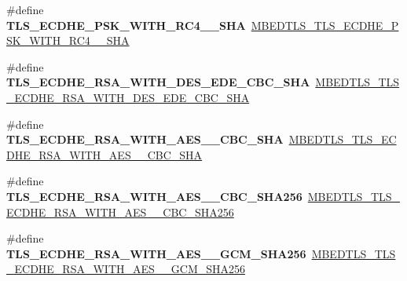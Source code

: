 \begin{DoxyCompactItemize}
\mbox{\label{compat-1_83_8h_a7d019962fe8f70ddc729687a7e0ccdb9}} 
\#define {\bfseries T\+L\+S\+\_\+\+E\+C\+D\+H\+E\+\_\+\+P\+S\+K\+\_\+\+W\+I\+T\+H\+\_\+\+R\+C4\+\_\+\_\+\+S\+HA}~\mbox{\hyperlink{ssl__ciphersuites_8h_a1dcf92a298581fa05208a0dbd34bb2fb}{M\+B\+E\+D\+T\+L\+S\+\_\+\+T\+L\+S\+\_\+\+E\+C\+D\+H\+E\+\_\+\+P\+S\+K\+\_\+\+W\+I\+T\+H\+\_\+\+R\+C4\+\_\+\_\+\+S\+HA}}
\item 
\mbox{\label{compat-1_83_8h_a7f0f5245bc820bbc208a4b30e3ea3302}} 
\#define {\bfseries T\+L\+S\+\_\+\+E\+C\+D\+H\+E\+\_\+\+R\+S\+A\+\_\+\+W\+I\+T\+H\+\_\+D\+E\+S\+\_\+\+E\+D\+E\+\_\+\+C\+B\+C\+\_\+\+S\+HA}~\mbox{\hyperlink{ssl__ciphersuites_8h_a2ce6bb7b4689abcfc4d1e60e4da6e8af}{M\+B\+E\+D\+T\+L\+S\+\_\+\+T\+L\+S\+\_\+\+E\+C\+D\+H\+E\+\_\+\+R\+S\+A\+\_\+\+W\+I\+T\+H\+\_\+D\+E\+S\+\_\+\+E\+D\+E\+\_\+\+C\+B\+C\+\_\+\+S\+HA}}
\item 
\mbox{\label{compat-1_83_8h_a61caecb35301de4dba9ea87288f58b91}} 
\#define {\bfseries T\+L\+S\+\_\+\+E\+C\+D\+H\+E\+\_\+\+R\+S\+A\+\_\+\+W\+I\+T\+H\+\_\+\+A\+E\+S\+\_\+\_\+\+C\+B\+C\+\_\+\+S\+HA}~\mbox{\hyperlink{ssl__ciphersuites_8h_a21b4bdb8de8f579c591bc5c45f1faf05}{M\+B\+E\+D\+T\+L\+S\+\_\+\+T\+L\+S\+\_\+\+E\+C\+D\+H\+E\+\_\+\+R\+S\+A\+\_\+\+W\+I\+T\+H\+\_\+\+A\+E\+S\+\_\+\_\+\+C\+B\+C\+\_\+\+S\+HA}}
\item 
\mbox{\label{compat-1_83_8h_acdd0b724733e8b6e408cc7ce53b6d0db}} 
\#define {\bfseries T\+L\+S\+\_\+\+E\+C\+D\+H\+E\+\_\+\+R\+S\+A\+\_\+\+W\+I\+T\+H\+\_\+\+A\+E\+S\+\_\+\_\+\+C\+B\+C\+\_\+\+S\+H\+A256}~\mbox{\hyperlink{ssl__ciphersuites_8h_a70908a91d8e474b415acfaf437e451a1}{M\+B\+E\+D\+T\+L\+S\+\_\+\+T\+L\+S\+\_\+\+E\+C\+D\+H\+E\+\_\+\+R\+S\+A\+\_\+\+W\+I\+T\+H\+\_\+\+A\+E\+S\+\_\+\_\+\+C\+B\+C\+\_\+\+S\+H\+A256}}
\item 
\mbox{\label{compat-1_83_8h_a3654359382307a986b1834a812c69f64}} 
\#define {\bfseries T\+L\+S\+\_\+\+E\+C\+D\+H\+E\+\_\+\+R\+S\+A\+\_\+\+W\+I\+T\+H\+\_\+\+A\+E\+S\+\_\+\_\+\+G\+C\+M\+\_\+\+S\+H\+A256}~\mbox{\hyperlink{ssl__ciphersuites_8h_a3d0bf2e4e26ea78e93012aa71225bb45}{M\+B\+E\+D\+T\+L\+S\+\_\+\+T\+L\+S\+\_\+\+E\+C\+D\+H\+E\+\_\+\+R\+S\+A\+\_\+\+W\+I\+T\+H\+\_\+\+A\+E\+S\+\_\+\_\+\+G\+C\+M\+\_\+\+S\+H\+A256}}
\item 

\end{DoxyCompactItemize}

